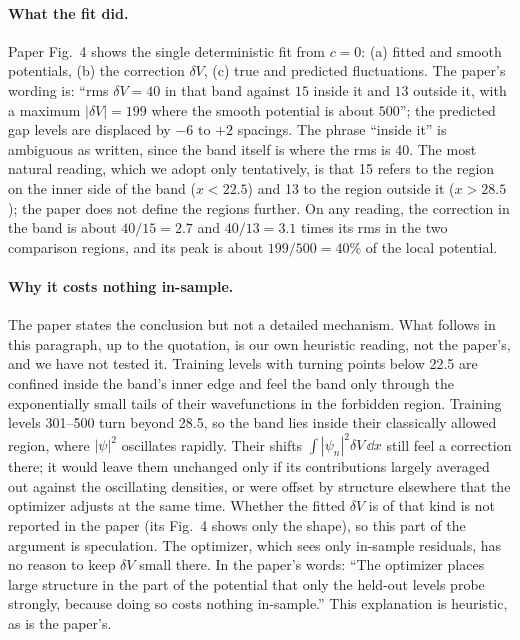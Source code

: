 \paragraph{What the fit did.} Paper Fig.~4 shows the single deterministic fit from $c=0$: (a) fitted and smooth potentials, (b) the correction $\delta V$, (c) true and predicted fluctuations. The paper's wording is: ``rms $\delta V = 40$ in that band against $15$ inside it and $13$ outside it, with a maximum $|\delta V| = 199$ where the smooth potential is about $500$''; the predicted gap levels are displaced by $-6$ to $+2$ spacings. The phrase ``inside it'' is ambiguous as written, since the band itself is where the rms is 40. The most natural reading, which we adopt only tentatively, is that 15 refers to the region on the inner side of the band ($x<22.5$) and 13 to the region outside it ($x>28.5$); the paper does not define the regions further. On any reading, the correction in the band is about $40/15=2.7$ and $40/13=3.1$ times its rms in the two comparison regions, and its peak is about $199/500=40\%$ of the local potential.

\paragraph{Why it costs nothing in-sample.} The paper states the conclusion but not a detailed mechanism. What follows in this paragraph, up to the quotation, is our own heuristic reading, not the paper's, and we have not tested it. Training levels with turning points below 22.5 are confined inside the band's inner edge and feel the band only through the exponentially small tails of their wavefunctions in the forbidden region. Training levels 301--500 turn beyond 28.5, so the band lies inside their classically allowed region, where $|\psi|^2$ oscillates rapidly. Their shifts $\int|\psi_n|^2\delta V\,\dd x$ still feel a correction there; it would leave them unchanged only if its contributions largely averaged out against the oscillating densities, or were offset by structure elsewhere that the optimizer adjusts at the same time. Whether the fitted $\delta V$ is of that kind is not reported in the paper (its Fig.~4 shows only the shape), so this part of the argument is speculation. The optimizer, which sees only in-sample residuals, has no reason to keep $\delta V$ small there. In the paper's words: ``The optimizer places large structure in the part of the potential that only the held-out levels probe strongly, because doing so costs nothing in-sample.'' This explanation is heuristic, as is the paper's.

